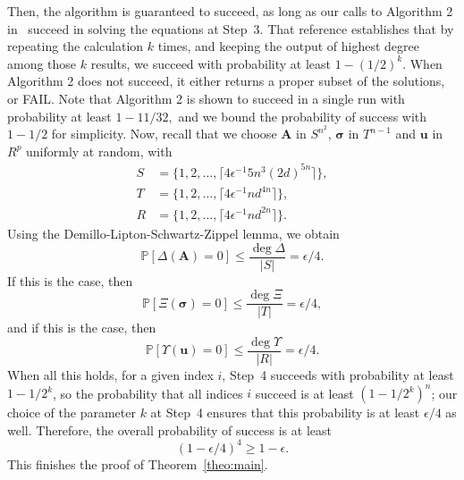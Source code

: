 \documentclass[12pt]{article}
\def\mA{{\bm A}}
\def\ub{{\bm u}}
\def\pr{\mathbb{P}}
\begin{document}
Then, the algorithm is guaranteed to succeed, as long as our calls to
Algorithm 2 in~\cite{SH} succeed in solving the equations at
Step~3. That reference establishes that by repeating the calculation
$k$ times, and keeping the output of highest degree among those $k$
results, we succeed with probability at least $1-(1/2)^k$. When
Algorithm 2 does not succeed, it either returns a proper subset of the
solutions, or FAIL. Note that Algorithm 2 is shown to succeed in a
single run with probability at least $1-11/32,$ and we bound the
probability of success with $1-1/2$ for simplicity.  Now, 
recall that we choose
 $\mA$ in $S^{n^2}$, $\bm \sigma$ in $T^{n-1}$ and $\ub$ in $R^{p}$ 
uniformly at random, with
\begin{align*}
S &= \{1,2,\hdots,\lceil 4\epsilon^{-1}5n^3(2d)^{5n}\rceil \},\\
T &= \{1,2,\hdots,\lceil 4\epsilon^{-1}nd^{4n} \rceil \},\\
R &= \{1,2,\hdots,\lceil 4\epsilon^{-1}nd^{2n} \rceil \}.
\end{align*}
Using the Demillo-Lipton-Schwartz-Zippel lemma, we obtain
\[
\pr[\Delta(\mA)=0] \leq  \frac{\deg\Delta}{|S|} = \epsilon/4.
\]
If this is the case, then 
\[
\pr[\Xi(\bm \sigma)=0] \leq  \frac{\deg\Xi}{|T|} = \epsilon/4,
\]
and if this is the case, then
\[
\pr[\Upsilon(\ub)=0] \leq  \frac{\deg\Upsilon}{|R|} = \epsilon/4.
\]
When all this holds, for a given index $i$, Step~4 succeeds with
probability at least $1-1/2^k$, so the probability that all indices
$i$ succeed is at least $(1-1/2^k)^n$; our choice of the parameter $k$
at Step~4 ensures that this probability is at least $\epsilon/4$ as
well. Therefore, the overall probability of success is
at least
\[(1-\epsilon/4)^4 \ge 1-\epsilon.\]
This finishes the proof of Theorem~\ref{theo:main}.



\end{document}
